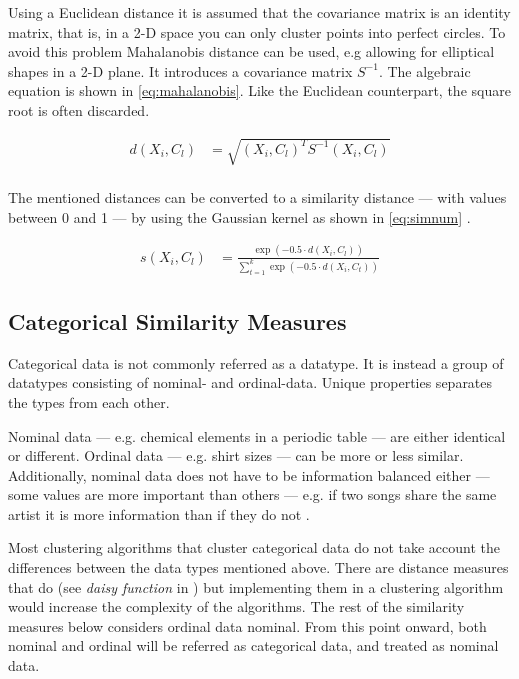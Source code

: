 \documentclass[../report.tex]{subfiles}
\begin{document}
Using a Euclidean distance it is assumed that the covariance matrix is an identity matrix, that is, in a 2-D space you can only cluster points into perfect circles. To avoid this problem Mahalanobis distance can be used, e.g allowing for elliptical shapes in a 2-D plane. It introduces a covariance matrix $S^{-1}$. The algebraic equation is shown in \ref{eq:mahalanobis}. Like the Euclidean counterpart, the square root is often discarded. 

\begin{align}
  \label{eq:mahalanobis}
  d(X_i,C_l) &= \sqrt{(X_i, C_l)^T S^{-1} (X_i, C_l)} \\
\end{align}

The mentioned distances can be converted to a similarity distance --- with values between 0 and 1 --- by using the Gaussian kernel as shown in \ref{eq:simnum} \cite{Cheung2013}.

\begin{align}
  \label{eq:simnum}
    s(X_i,C_l) &= \frac{\exp(-0.5 \cdot d(X_i,C_l))}{\sum^k_{t=1}\exp(-0.5 \cdot d(X_i,C_t))}
\end{align}


\subsection{Categorical Similarity Measures}
Categorical data is not commonly referred as a datatype. It is instead a group of datatypes consisting of nominal- and ordinal-data. Unique properties separates the types from each other.

Nominal data --- e.g. chemical elements in a periodic table  --- are either identical or different. Ordinal data --- e.g. shirt sizes --- can be more or less similar. Additionally, nominal data does not have to be information balanced either --- some values are more important than others --- e.g. if two songs share the same artist it is more information than if they do not \cite{Kaufman1990}.

Most clustering algorithms that cluster categorical data do not take account the differences between the data types mentioned above. There are distance measures that do (see \textit{daisy function} in \cite{Kaufman1990}) but implementing them in a clustering algorithm would increase the complexity of the algorithms. The rest of the similarity measures below considers ordinal data nominal. From this point onward, both nominal and ordinal will be referred as categorical data, and treated as nominal data.
\end{document}

